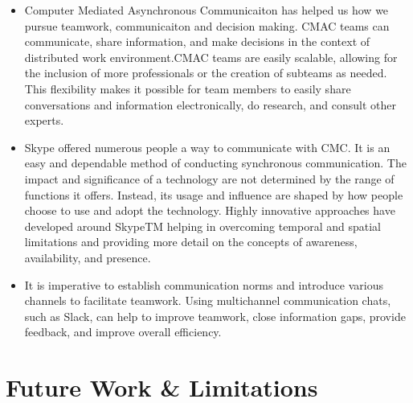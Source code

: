\documentclass{llncs}
\begin{document}
\begin{itemize}
    \item Computer Mediated Asynchronous Communicaiton has helped us how we pursue teamwork, communicaiton and decision making. CMAC teams can communicate, share information, and make decisions in the context of distributed work environment.CMAC teams are easily scalable, allowing for the inclusion of more professionals or the creation of subteams as needed. This flexibility makes it possible for team members to easily share conversations and information electronically, do research, and consult other experts. ~\cite{refpaper6}\\
    \item Skype offered numerous people a way to communicate with CMC. It is an easy and dependable method of conducting synchronous communication. The impact and significance of a technology are not determined by the range of functions it offers. Instead, its usage and influence are shaped by how people choose to use and adopt the technology. Highly innovative approaches have developed around SkypeTM  helping in overcoming  temporal and spatial limitations and providing more detail on the concepts of awareness, availability, and presence.~\cite{refpaper9}\\
    \item It is imperative to establish communication norms and introduce various channels to facilitate teamwork. Using multichannel communication chats, such as Slack, can help to improve teamwork, close information gaps, provide feedback, and improve overall efficiency. ~\cite{refpaper9}

\end{itemize}

\section{Future Work \& Limitations}
\end{document}
